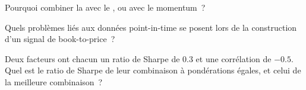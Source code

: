 \begin{interviewq}\label{iq:s1:value-quality-and-low-risk:4}
Pourquoi combiner la  avec le , ou avec le momentum~?
\end{interviewq}

\begin{interviewq}\label{iq:s1:value-quality-and-low-risk:5}
Quels problèmes liés aux données point-in-time se posent lors de la construction d'un signal de book-to-price~?
\end{interviewq}

\begin{interviewq}\label{iq:s1:value-quality-and-low-risk:6}
Deux facteurs ont chacun un ratio de Sharpe de 0.3 et une corrélation de $-0.5$. Quel est le ratio de Sharpe de leur combinaison à pondérations égales, et celui de la meilleure
combinaison~?
\end{interviewq}
